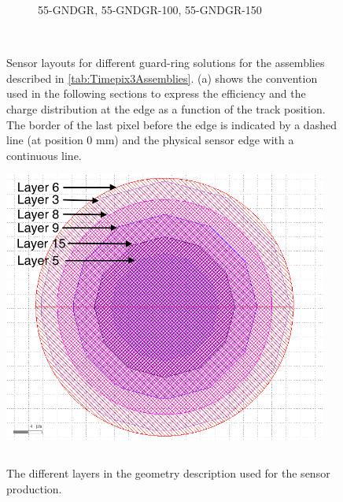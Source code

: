 \begin{figure}[htbp]
\begin{subfigure}[t]{0.5\textwidth}
\begin{tikzpicture}
    \end{tikzpicture}
    \caption{55-GNDGR, 55-GNDGR-100, 55-GNDGR-150}
    \label{fig:Layout50_GNDGR}
  \end{subfigure}~
  \caption{Sensor layouts for different guard-ring solutions for the
    assemblies described in \cref{tab:Timepix3Assemblies}. (a) shows
    the convention used in the following sections to express the
    efficiency and the charge distribution at the edge as a function
    of the track position. The border of the last pixel before the
    edge is indicated by a dashed line (at position 0 mm) and the
    physical sensor edge with a continuous line.}
  \label{fig:Layout_guard_ring}
\end{figure}


\begin{figure}[htbp]
  \centering
  \begin{minipage}[t]{.4\textwidth}
    \centering
    \vspace{0pt}
    \includegraphics[width=0.95\textwidth]{figures/ActiveEdge/pixelLayout_withLayers.png}
    \caption{The different layers in the geometry description used for
      the sensor production.}
    \label{fig:PixelLayout}
  \end{minipage}
  \hfill
  \begin{minipage}[t]{.56\textwidth}
    \centering
    \vspace{0pt}
    \label{tab:PixelStackDimensions}
    \begin{tabular}{l l}

\end{tabular}
\end{minipage}
\end{figure}
